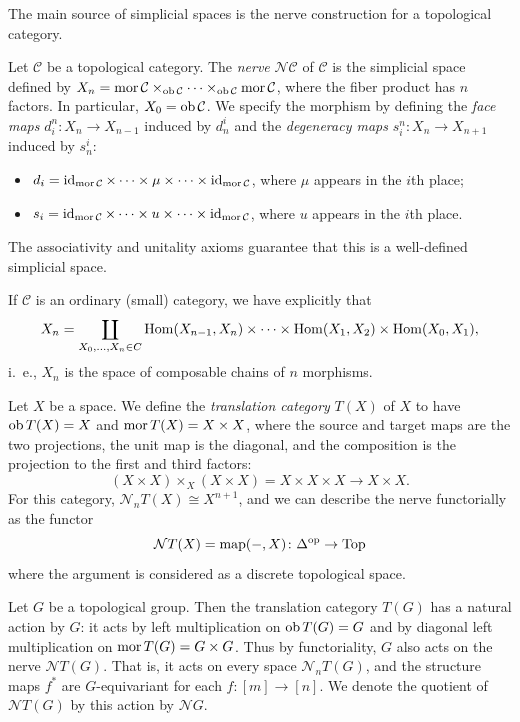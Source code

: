 \documentclass[a4paper,openany]{scrbook}
\renewcommand{\C}{\mathcal C}
\newcommand{\nerve}{\mathcal N}
\begin{document}
The main source of simplicial spaces is the nerve construction for a topological category.


\begin{defn}
Let $\C$ be a topological category. The \emph{nerve} $\nerve\C$ of $\C$ is the simplicial space defined by $X_n = \mor \C \times_{\ob \C} \cdots \times_{\ob \C} \mor\C$, where the fiber product has $n$ factors. In particular, $X_0 = \ob \C$. We specify the morphism by defining the \emph{face maps} $d_i^n\colon X_n \to X_{n-1}$ induced by $d^i_n$ and the \emph{degeneracy maps} $s_i^n\colon X_n \to X_{n+1}$ induced by $s^i_n$:
\begin{itemize}
\item $d_i = \id_{\mor \C} \times \cdots \times \mu \times \cdots \times \id_{\mor \C}$, where $\mu$ appears in the $i$th place;
\item $s_i = \id_{\mor \C} \times \cdots \times u \times \cdots \times \id_{\mor \C}$, where $u$ appears in the $i$th place.
\end{itemize}
The associativity and unitality axioms guarantee that this is a well-defined simplicial space.
\end{defn}

If $\C$ is an ordinary (small) category, we have explicitly that
\[
X_n = \coprod_{X_0,\dots,X_n \in C} \operatorname{Hom}(X_{n-1},X_n) \times \dots \times \operatorname{Hom}(X_1,X_2) \times \operatorname{Hom}(X_0,X_1),
\]
i.~e., $X_n$ is the space of composable chains of $n$ morphisms.

\begin{example}\label{ex:translationcat}
Let $X$ be a space. We define the \emph{translation category} $T(X)$ of $X$ to have $\operatorname{ob} T(X) = X$ and $\operatorname{mor} T(X) = X \times X$, where the source and target maps are the two projections, the unit map is the diagonal, and the composition is the projection to the first and third factors:
\[
(X \times X) \times_X (X \times X) = X \times X \times X \to X \times X.
\]
For this category, $\nerve_n T(X) \cong X^{n+1}$, and we can describe the nerve functorially as the functor
\[
\nerve T(X) = \map(-,X)\colon \Delta^\op \to \Top
\]
where the argument is considered as a discrete topological space.
\end{example}

\begin{example}\label{ex:translationcatofgroup}
Let $G$ be a topological group. Then the translation category $T(G)$ has a natural action by $G$: it acts by left multiplication on $\operatorname{ob} T(G) = G$ and by diagonal left multiplication on $\operatorname{mor} T(G) = G \times G$. Thus by functoriality, $G$ also acts on the nerve $\nerve T(G)$. That is, it acts on every space $\nerve_n T(G)$, and the structure maps $f^*$ are $G$-equivariant for each $f\colon [m] \to [n]$. We denote the quotient of $\nerve T(G)$ by this action by $\nerve G$.
\end{example}
\end{document}
